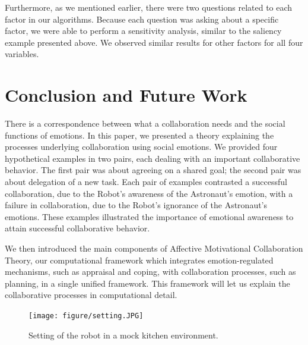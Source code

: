 Furthermore, as we mentioned earlier, there were two questions related to each
factor in our algorithms. Because each question was asking about a specific
factor, we were able to perform a sensitivity analysis, similar to the saliency
example presented above. We observed similar results for other factors for all
four variables.

\section{Conclusion and Future Work}

There is a correspondence between what a collaboration needs and the social
functions of emotions. In this paper, we presented a theory explaining the
processes underlying collaboration using social emotions. We provided four
hypothetical examples in two pairs, each dealing with an important collaborative
behavior. The first pair was about agreeing on a shared goal; the second pair
was about delegation of a new task. Each pair of examples contrasted a
successful collaboration, due to the Robot's awareness of the Astronaut's
emotion, with a failure in collaboration, due to the Robot's ignorance of the
Astronaut's emotions. These examples illustrated the importance of
emotional awareness to attain successful collaborative behavior.

We then introduced the main components of Affective Motivational Collaboration
Theory, our computational framework which integrates emotion-regulated
mechanisms, such as appraisal and coping, with collaboration processes, such as
planning, in a single unified framework. This framework will let us explain
the collaborative processes in computational detail.

\begin{figure}[tbh]
  \vspace{-1mm}
  \centering
  \texttt{[image: figure/setting.JPG]}
  \caption{{\fontsize{9}{9}\selectfont Setting of the robot in a mock kitchen
  environment.}}
  \label{fig:setting}
  \vspace{-2mm}
\end{figure}

